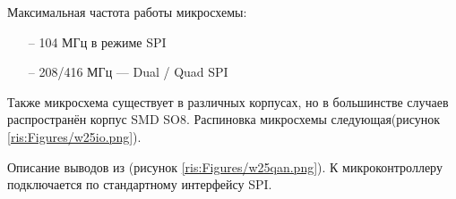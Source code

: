 \begin{sloppypar}
Максимальная частота работы микросхемы:
\begin{onehalfspace}
	\begin{itemize}
		\item[--]104 МГц в режиме SPI
		\item[--]208/416 МГц — Dual / Quad SPI
	\end{itemize}
\end{onehalfspace}

Также микросхема существует в различных корпусах, но в большинстве случаев распространён корпус SMD SO8. Распиновка микросхемы следующая(рисунок \ref{ris:Figures/w25io.png}).

Описание выводов из  \cite {W25Q}(рисунок \ref{ris:Figures/w25qan.png}).
К микроконтроллеру подключается по стандартному интерфейсу SPI.



\end{sloppypar}
